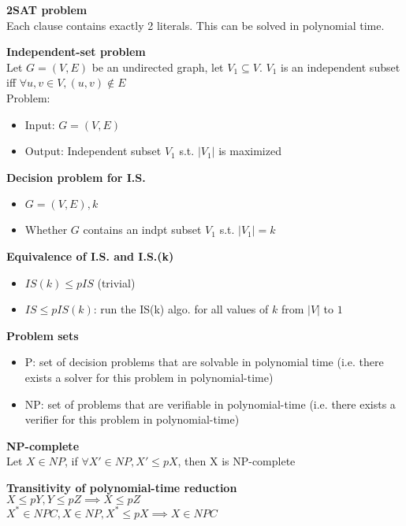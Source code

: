 \documentclass[10pt,letterpaper,landscape]{report}
\newcommand{\boxheight}{21.59cm}
\newcommand{\boxwidth}{8.85cm}
\begin{document}
\begin{small}
{\begin{minipage}[t][\boxheight][c]{\boxwidth}
    
    \textbf{2SAT problem}\\
    Each clause contains exactly 2 literals. This can be solved in polynomial time.
    
    \textbf{Independent-set problem}\\
    Let $G=(V,E)$ be an undirected graph, let $V_1 \subseteq V$. $V_1$ is an independent subset iff $\forall u,v\in V, (u,v) \notin E$\\
    Problem:
    \begin{itemize}
        \item Input: $G = (V,E)$
        \item Output: Independent subset $V_1$ s.t. $|V_1|$ is maximized
    \end{itemize}
    
    \textbf{Decision problem for I.S.}
    \begin{itemize}
        \item $G=(V,E), k$
        \item Whether $G$ contains an indpt subset $V_1$ s.t. $|V_1| = k$
    \end{itemize}
    
    \textbf{Equivalence of I.S. and I.S.(k)}
    \begin{itemize}
        \item $IS(k) \leq p IS$ (trivial)
        \item $IS \leq p IS(k)$: run the IS(k) algo. for all values of $k$ from $|V|$ to $1$
    \end{itemize}
    
    \textbf{Problem sets}
    \begin{itemize}
        \item P: set of decision problems that are solvable in polynomial time (i.e. there exists a solver for this problem in polynomial-time)
        \item NP: set of problems that are verifiable in polynomial-time (i.e. there exists a verifier for this problem in polynomial-time)
    \end{itemize}
    
    \textbf{NP-complete}\\
    Let $X\in NP$, if $\forall X' \in NP, X' \leq pX$, then X is NP-complete
    
    \textbf{Transitivity of polynomial-time reduction}\\
    $X \leq pY, Y \leq pZ \implies X \leq pZ$\\
    $X^* \in NPC, X\in NP, X^* \leq p X \implies X \in NPC$
    

\end{minipage}}
\end{small}
\end{document}
